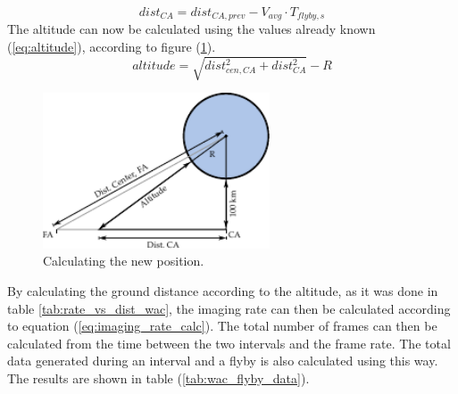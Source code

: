 \begin{equation}\label{eq:fa_to_ca}
dist_{CA} = dist_{CA,prev}-V_{avg}\cdot T_{flyby,s}
\end{equation}
The altitude can now be calculated using the values already known (\ref{eq:altitude}), according to figure (\ref{fig:linear_flyby_move}).
\begin{equation}\label{eq:altitude}
altitude = \sqrt{dist_{cen,CA}^2+dist_{CA}^2}-R
\end{equation}
\begin{figure}[h!]
\centering
\includegraphics[width=0.6\textwidth]{figures/Orbiter/linear_flyby_move.pdf}
\caption{Calculating the new position.}
\label{fig:linear_flyby_move}
\end{figure}
By calculating the ground distance according to the altitude, as it was done in table \ref{tab:rate_vs_dist_wac}, the imaging rate can then be calculated according to equation (\ref{eq:imaging_rate_calc}). The total number of frames can then be calculated from the time between the two intervals and the frame rate. The total data generated during an interval and a flyby is also calculated using this way. The results are shown in table (\ref{tab:wac_flyby_data}).
